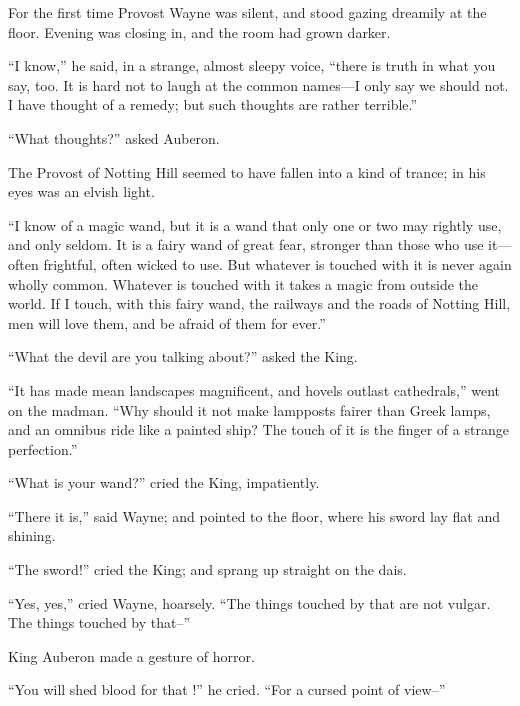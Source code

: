 \documentclass{book}
\begin{document}
For the first time Provost Wayne was silent, and stood gazing dreamily at the floor. Evening was closing in, and the room had grown darker.

“I know,” he said, in a strange, almost sleepy voice, “there is truth in what you say, too. It is hard not to laugh at the common names—I only say we should not. I have thought of a remedy; but such thoughts are rather terrible.”

“What thoughts?” asked Auberon.

The Provost of Notting Hill seemed to have fallen into a kind of trance; in his eyes was an elvish light.

“I know of a magic wand, but it is a wand that only one or two may rightly use, and only seldom. It is a fairy wand of great fear, stronger than those who use it—often frightful, often wicked to use. But whatever is touched with it is never again wholly common. Whatever is touched with it takes a magic from outside the world. If I touch, with this fairy wand, the railways and the roads of Notting Hill, men will love them, and be afraid of them for ever.”

“What the devil are you talking about?” asked the King.

“It has made mean landscapes magnificent, and hovels outlast cathedrals,” went on the madman. “Why should it not make lampposts fairer than Greek lamps, and an omnibus ride like a painted ship? The touch of it is the finger of a strange perfection.”

“What is your wand?” cried the King, impatiently.

“There it is,” said Wayne; and pointed to the floor, where his sword lay flat and shining.

“The sword!” cried the King; and sprang up straight on the dais.

“Yes, yes,” cried Wayne, hoarsely. “The things touched by that are not vulgar. The things touched by that–”

King Auberon made a gesture of horror.

“You will shed blood for that !” he cried. “For a cursed point of view–”
\end{document}
